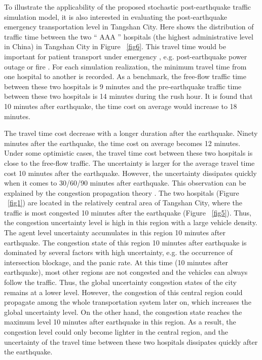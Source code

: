 \documentclass[review,11pt,nonatbib]{elsarticle}
\begin{document}
To illustrate the applicability of the proposed stochastic post-earthquake traffic simulation model, it is also interested in evaluating the post-earthquake emergency transportation level in Tangshan City. Here shows the distribution of traffic time between the two `` AAA '' hospitals (the highest administrative level in China) in Tangshan City in Figure ~\ref{fig6}. This travel time would be important for patient transport under emergency \citep{ceferino2020effective}, e.g. post-earthquake power outage or fire . For each simulation realization, the minimum travel time from one hospital to another is recorded. As a benchmark, the free-flow traffic time between these two hospitals is 9 minutes and the pre-earthquake traffic time between these two hospitals is 14 minutes during the rush hour. It is found that 10 minutes after earthquake, the time cost on average would increase to 18 minutes. 

The travel time cost decrease with a longer duration after the earthquake. Ninety minutes after the earthquake, the time cost on average becomes 12 minutes. Under some optimistic cases, the travel time cost between these two hospitals is close to the free-flow traffic. The uncertainty is larger for the average travel time cost 10 minutes after the earthquake. However, the uncertainty dissipates quickly when it comes to 30/60/90 minutes after earthquake. This observation can be explained by the congestion propagation theory \citep{zhao2016spatio}. The two hospitals (Figure ~\ref{fig1}) are located in the relatively central area of Tangshan City, where the traffic is most congested 10 minutes after the earthquake (Figure ~\ref{fig5}). Thus, the congestion uncertainty level is high in this region with a large vehicle density. The agent level uncertainty accumulates in this region 10 minutes after earthquake. The congestion state of this region 10 minutes after earthquake is dominated by several factors with high uncertainty, e.g. the occurrence of intersection blockage, and the panic rate. At this time (10 minutes after earthquake), most other regions are not congested and the vehicles can always follow the traffic. Thus, the global uncertainty congestion states of the city remains at a lower level. However, the congestion of this central region could propagate among the whole transportation system later on, which increases the global uncertainty level. On the other hand, the congestion state reaches the maximum level 10 minutes after earthquake in this region. As a result, the congestion level could only become lighter in the central region, and the uncertainty of the travel time between these two hospitals dissipates quickly after the earthquake.
\end{document}
